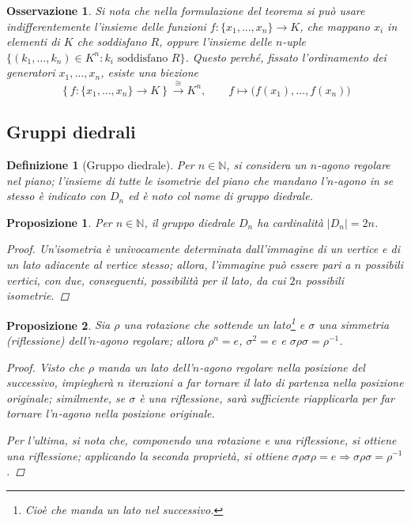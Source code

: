 \documentclass[12pt]{scrartcl}
\theoremstyle{style}
\newtheorem{definizione}{Definizione}[section]
\newtheorem{prop}{Proposizione}[section]
\newtheorem{osservazione}{Osservazione}[section]
\numberwithin{equation}{subsection}
\begin{document}
\begin{osservazione}
Si nota che nella formulazione del teorema si può usare indifferentemente l'insieme delle funzioni \(f:\{x_1,\dots,x_n\}\longrightarrow K\), che mappano \(x_i\) in elementi di \(K\) che soddisfano \(R\), oppure l'insieme delle \(n\)-uple \(\{(k_1,\dots,k_n)\in K^n:k_i \text{ soddisfano } R\}\).
Questo perché, fissato l'ordinamento dei generatori \(x_1,\dots,x_n\), esiste una biezione 
\[
\left\{ f:\{x_1,\dots,x_n\}\longrightarrow  K\right\}\xrightarrow{\ \cong\ }K^n,\qquad f\longmapsto\big(f(x_1),\dots,f(x_n)\big)
\]
\end{osservazione}

\subsection{Gruppi diedrali}
\begin{definizione}
	[Gruppo diedrale]
	Per $n \in \mathbb{N}$, si considera un $n$-agono regolare nel piano; l'insieme di tutte le isometrie del piano che mandano l'$n$-agono in se stesso \`e indicato con $D_n$ ed \`e noto col nome di \textit{gruppo diedrale}.
\end{definizione}
\begin{prop}
	Per $n \in \mathbb{N}$, il gruppo diedrale $D_n$ ha cardinalit\`a $\lvert D_n \rvert = 2n$.
	\begin{proof}
		Un'isometria \`e univocamente determinata dall'immagine di un vertice e di un lato adiacente al vertice stesso; allora, l'immagine pu\`o essere pari a $n$ possibili vertici, con due, conseguenti, possibilit\`a per il lato, da cui $2n$ possibili isometrie.
	\end{proof}
\end{prop}
\begin{prop}
	Sia $\rho $ una rotazione che sottende un lato\footnote{Cioè che manda un lato nel successivo.} e $\sigma $ una simmetria (riflessione) dell'$n$-agono regolare; allora $\rho ^n = e$, $\sigma ^2 =e$ e $\sigma \rho \sigma = \rho ^{-1} $.
	\begin{proof}
		Visto che $\rho $ manda un lato dell'$n$-agono regolare nella posizione del successivo, impiegher\`a $n$ iterazioni a far tornare il lato di partenza nella posizione originale; similmente, se $\sigma $ \`e una riflessione, sar\`a sufficiente riapplicarla per far tornare l'$n$-agono nella posizione originale.

		Per l'ultima, si nota che, componendo una rotazione e una riflessione, si ottiene una riflessione; applicando la seconda propriet\`a, si ottiene $\sigma \rho \sigma \rho = e \Rightarrow \sigma \rho \sigma  = \rho ^{-1} $.
	\end{proof}
\end{prop}
\end{document}
